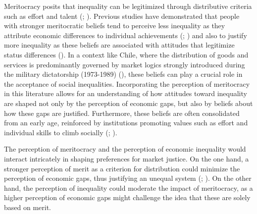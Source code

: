 \documentclass[
  12pt,
]{article}
\begin{document}
Meritocracy posits that inequality can be legitimized through
distributive criteria such as effort and talent
(;
). Previous studies have
demonstrated that people with stronger meritocratic beliefs tend to
perceive less inequality as they attribute economic differences to
individual achievements (;
) and also to justify more
inequality as these beliefs are associated with attitudes that
legitimize status differences
(). In a context
like Chile, where the distribution of goods and services is
predominantly governed by market logics strongly introduced during the
military dictatorship (1973-1989)
(), these beliefs can
play a crucial role in the acceptance of social inequalities.
Incorporating the perception of meritocracy in this literature allows
for an understanding of how attitudes toward inequality are shaped not
only by the perception of economic gaps, but also by beliefs about how
these gaps are justified. Furthermore, these beliefs are often
consolidated from an early age, reinforced by institutions promoting
values such as effort and individual skills to climb socially
(;
).

The perception of meritocracy and the perception of economic inequality
would interact intricately in shaping preferences for market justice. On
the one hand, a stronger perception of merit as a criterion for
distribution could minimize the perception of economic gaps, thus
justifying an unequal system
(;
). On the other hand, the
perception of inequality could moderate the impact of meritocracy, as a
higher perception of economic gaps might challenge the idea that these
are solely based on merit.
\end{document}
